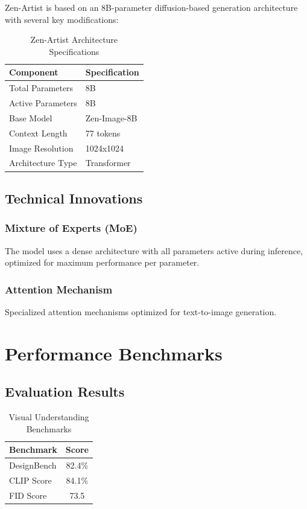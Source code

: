 \documentclass[11pt,a4paper]{article}
\begin{document}
Zen-Artist is based on an 8B-parameter diffusion-based generation architecture with several key modifications:

\begin{table}[H]
\centering
\begin{tabular}{ll}
\toprule
\textbf{Component} & \textbf{Specification} \\
\midrule
Total Parameters & 8B \\
Active Parameters & 8B \\
Base Model & Zen-Image-8B \\
Context Length & 77 tokens \\

Image Resolution & 1024x1024 \\

Architecture Type & Transformer \\
\bottomrule
\end{tabular}
\caption{Zen-Artist Architecture Specifications}
\end{table}

\subsection{Technical Innovations}

\subsubsection{Mixture of Experts (MoE)}
The model uses a dense architecture with all parameters active during inference, optimized for maximum performance per parameter.

\subsubsection{Attention Mechanism}
Specialized attention mechanisms optimized for text-to-image generation.

\section{Performance Benchmarks}

\subsection{Evaluation Results}

\begin{table}[H]
\centering
\begin{tabular}{lc}
\toprule
\textbf{Benchmark} & \textbf{Score} \\
\midrule
DesignBench & 82.4\% \\
CLIP Score & 84.1\% \\
FID Score & 73.5 \\
\bottomrule
\end{tabular}
\caption{Visual Understanding Benchmarks}
\end{table}
\end{document}
